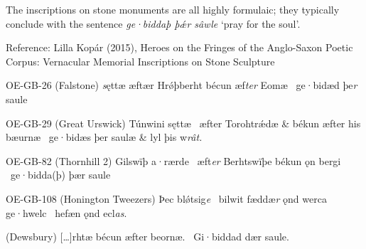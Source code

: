 The inscriptions on stone monuments are all highly formulaic; they typically conclude with the sentence \emph{ge·biddaþ þǽr sâwle} ‘pray for the soul’.

Reference: Lilla Kopár (2015), Heroes on the Fringes of the Anglo-Saxon Poetic Corpus: Vernacular Memorial Inscriptions on Stone Sculpture

OE-GB-26 (Falstone)
\emph{s}ęttæ æftær Hrǿþberht
bécun æf\emph{ter} Eomæ \hld\ ge·bidæd þe\emph{r} saule

OE-GB-29 (Great Urswick)
Túnwini sęttæ \hld\ æfter Torohtrǽdæ &
békun æfter his bæurnæ \hld\ ge·bidæs þer saulæ &
lyl þis w\emph{rât.}

OE-GB-82 (Thornhill 2)
Gilswïþ a·rærde \hld\ æft\emph{er} Berhtswïþe
békun ǫn bergi \hld\ ge·bidda(þ) þær saule

OE-GB-108 (Honington Tweezers)
Þec blǿtsig\emph{e} \hld\ bilwit fæddæ\emph{r}
ǫnd werca ge·hwelc \hld\ hefæn ǫnd ecl\emph{as}.

(Dewsbury)
[\dots]rhtæ
bécun æfter beornæ. \hld\ Gi·biddad dær saule.
